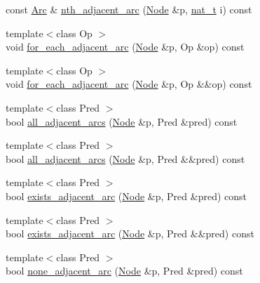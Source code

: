 \begin{DoxyCompactItemize}
\item 
const \hyperlink{namespace_designar_a3f55fb5513d62ff47cbc8f72b8e95d6f}{Arc} \& \hyperlink{class_designar_1_1_base_graph_a3ca561f708fec1724d5c95192f98ef96}{nth\+\_\+adjacent\+\_\+arc} (\hyperlink{namespace_designar_a5af326c65aa2bd26b26c410f2030d09e}{Node} \&p, \hyperlink{namespace_designar_aa72662848b9f4815e7bf31a7cf3e33d1}{nat\+\_\+t} i) const
\item 
{\footnotesize template$<$class Op $>$ }\\void \hyperlink{class_designar_1_1_base_graph_a5e35c97bdf055f67e744f7d961ccb6a9}{for\+\_\+each\+\_\+adjacent\+\_\+arc} (\hyperlink{namespace_designar_a5af326c65aa2bd26b26c410f2030d09e}{Node} \&p, Op \&op) const
\item 
{\footnotesize template$<$class Op $>$ }\\void \hyperlink{class_designar_1_1_base_graph_a21553c1d96334e4cf2e0e2086e0efeba}{for\+\_\+each\+\_\+adjacent\+\_\+arc} (\hyperlink{namespace_designar_a5af326c65aa2bd26b26c410f2030d09e}{Node} \&p, Op \&\&op) const
\item 
{\footnotesize template$<$class Pred $>$ }\\bool \hyperlink{class_designar_1_1_base_graph_af7a57a1088105a79466546620bf830b3}{all\+\_\+adjacent\+\_\+arcs} (\hyperlink{namespace_designar_a5af326c65aa2bd26b26c410f2030d09e}{Node} \&p, Pred \&pred) const
\item 
{\footnotesize template$<$class Pred $>$ }\\bool \hyperlink{class_designar_1_1_base_graph_aaae4400215b8ea6b55941875981c3892}{all\+\_\+adjacent\+\_\+arcs} (\hyperlink{namespace_designar_a5af326c65aa2bd26b26c410f2030d09e}{Node} \&p, Pred \&\&pred) const
\item 
{\footnotesize template$<$class Pred $>$ }\\bool \hyperlink{class_designar_1_1_base_graph_a5208fcd131d919271e1d54f6e45ab3e9}{exists\+\_\+adjacent\+\_\+arc} (\hyperlink{namespace_designar_a5af326c65aa2bd26b26c410f2030d09e}{Node} \&p, Pred \&pred) const
\item 
{\footnotesize template$<$class Pred $>$ }\\bool \hyperlink{class_designar_1_1_base_graph_a16d3fbb089265c1dc8da8ffbe2fb1434}{exists\+\_\+adjacent\+\_\+arc} (\hyperlink{namespace_designar_a5af326c65aa2bd26b26c410f2030d09e}{Node} \&p, Pred \&\&pred) const
\item 
{\footnotesize template$<$class Pred $>$ }\\bool \hyperlink{class_designar_1_1_base_graph_acf4b230e0d981f36770722011c96206f}{none\+\_\+adjacent\+\_\+arc} (\hyperlink{namespace_designar_a5af326c65aa2bd26b26c410f2030d09e}{Node} \&p, Pred \&pred) const

\end{DoxyCompactItemize}
